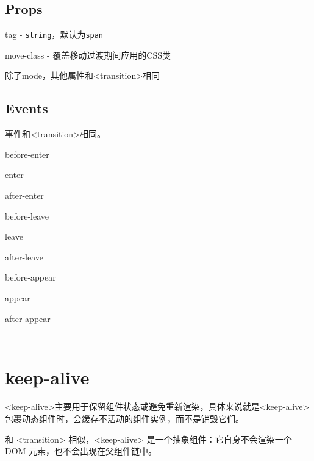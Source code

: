 \subsection{Props}


\begin{compactitem}
\item tag - \texttt{string}，默认为\texttt{span}
\item move-class - 覆盖移动过渡期间应用的CSS类
\item 除了mode，其他属性和<transition>相同
\end{compactitem}


\subsection{Events}

事件和<transition>相同。


\begin{compactitem}
\item before-enter
\item enter
\item after-enter
\item before-leave
\item leave
\item after-leave
\item before-appear
\item appear
\item after-appear
\end{compactitem}


\begin{lstlisting}[language=JavaScript]

\end{lstlisting}




\begin{lstlisting}[language=JavaScript]

\end{lstlisting}




\section{keep-alive}


<keep-alive>主要用于保留组件状态或避免重新渲染，具体来说就是<keep-alive> 包裹动态组件时，会缓存不活动的组件实例，而不是销毁它们。


和 <transition> 相似，<keep-alive> 是一个抽象组件：它自身不会渲染一个 DOM 元素，也不会出现在父组件链中。


